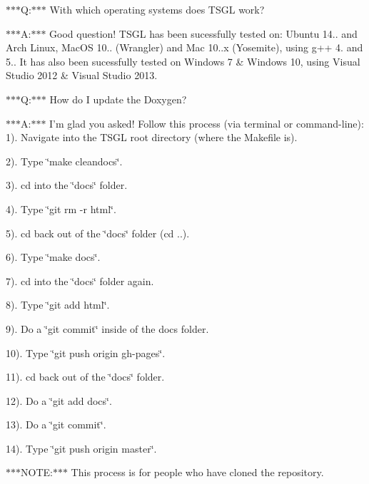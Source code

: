 $\ast$$\ast$$\ast$\-Q\-:$\ast$$\ast$$\ast$ With which operating systems does T\-S\-G\-L work?

$\ast$$\ast$$\ast$\-A\-:$\ast$$\ast$$\ast$ Good question! T\-S\-G\-L has been sucessfully tested on\-: Ubuntu 14.. and Arch Linux, Mac\-O\-S 10.. (Wrangler) and Mac 10..\-x (Yosemite), using g++ 4. and 5.. It has also been sucessfully tested on Windows 7 \& Windows 10, using Visual Studio 2012 \& Visual Studio 2013.

$\ast$$\ast$$\ast$\-Q\-:$\ast$$\ast$$\ast$ How do I update the Doxygen?

$\ast$$\ast$$\ast$\-A\-:$\ast$$\ast$$\ast$ I'm glad you asked! Follow this process (via terminal or command-\/line)\-: 1). Navigate into the T\-S\-G\-L root directory (where the Makefile is).

2). Type \char`\"{}make cleandocs\char`\"{}.

3). cd into the \char`\"{}docs\char`\"{} folder.

4). Type \char`\"{}git rm -\/r html\char`\"{}.

5). cd back out of the \char`\"{}docs\char`\"{} folder (cd ..).

6). Type \char`\"{}make docs\char`\"{}.

7). cd into the \char`\"{}docs\char`\"{} folder again.

8). Type \char`\"{}git add html\char`\"{}.

9). Do a \char`\"{}git commit\char`\"{} inside of the docs folder.

10). Type \char`\"{}git push origin gh-\/pages\char`\"{}.

11). cd back out of the \char`\"{}docs\char`\"{} folder.

12). Do a \char`\"{}git add docs\char`\"{}.

13). Do a \char`\"{}git commit\char`\"{}.

14). Type \char`\"{}git push origin master\char`\"{}.

$\ast$$\ast$$\ast$\-N\-O\-T\-E\-:$\ast$$\ast$$\ast$ This process is for people who have cloned the repository. 